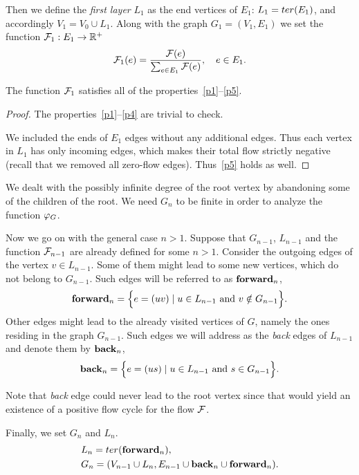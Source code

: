 \documentclass[12pt,oneside,a4paper]{amsart}
\begin{document}
        Then we define the \emph{first layer} $L_1$ as the end vertices of $E_1$: $L_1 = ter(E_1)$, and accordingly
          $V_1 = V_0 \cup L_1$.
        Along with the graph $G_1 = (V_1, E_1)$ we set the function $\mathcal{F}_{1}: E_1 \to \mathbb{R}^{+}$
        \[
          \mathcal{F}_{1}(e) = \frac{\mathcal{F}(e)}{\sum_{e\in E_1}{\mathcal{F}(e)}}, \quad e \in E_1.
        \]
        \begin{prop}
          The function $\mathcal{F}_{1}$ satisfies all of the properties~\ref{p1}--\ref{p5}.
        \end{prop}
        \begin{proof}
          The properties~\ref{p1}--\ref{p4} are trivial to check.

          We included the ends of $E_1$ edges without any additional edges.
          Thus each vertex in $L_1$ has only incoming edges, which makes their
            total flow strictly negative (recall that we removed all zero-flow edges).
          Thus~\ref{p5} holds as well.
        \end{proof}
        \begin{remark}
          We dealt with the possibly infinite degree of the root vertex by abandoning some of the children of the root.
          We need $G_n$ to be finite in order to analyze the function $\varphi_{G}$.
        \end{remark}

        Now we go on with the general case $n > 1$.
        Suppose that $G_{n-1}$, $L_{n-1}$ and the function $\mathcal{F}_{n-1}$ are already defined for some $n > 1$.
        Consider the outgoing edges of the vertex $v \in L_{n-1}$.
        Some of them might lead to some new vertices, which do not belong to $G_{n-1}$.
        Such edges will be referred to as $\mathbf{forward}_n$,
        \[
          \mathbf{forward}_n = \Big\{ e = (uv) \mid u \in L_{n-1} \text{ and } v \notin G_{n-1}\Big\}.
        \]
        Other edges might lead to the already visited vertices of $G$, namely the ones residing in the graph $G_{n-1}$.
        Such edges we will address as the \emph{back} edges of $L_{n-1}$ and denote them by $\mathbf{back}_n$,
        \[
          \mathbf{back}_n = \Big\{e = (us) \mid u \in L_{n-1} \text{ and } s \in G_{n-1}\Big\}.
        \]
        \begin{remark}
          Note that \emph{back} edge could never lead to the root vertex since that
            would yield an existence of a positive flow cycle for the flow $\mathcal{F}$.
        \end{remark}
        Finally, we set $G_n$ and $L_n$.
        \begin{align*}
          &L_n = ter(\mathbf{forward}_n),\\
          &G_n = (V_{n-1} \cup L_n, E_{n-1} \cup \mathbf{back}_n \cup \mathbf{forward}_n).
        \end{align*}
\end{document}
